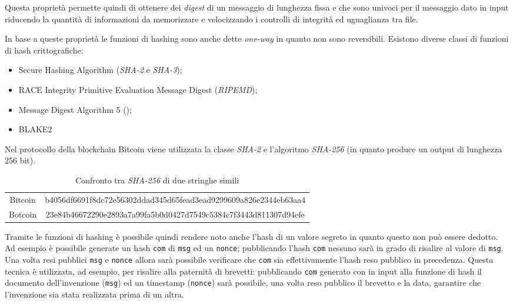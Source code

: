 Questa proprietà permette quindi di ottenere dei \textit{digest} di un messaggio di lunghezza fissa e che sono univoci per il messaggio dato in input riducendo la quantità di informazioni da memorizzare e velocizzando i controlli di integrità ed uguaglianza tra file.

In base a queste proprietà le funzioni di hashing sono anche dette \textit{one-way} in quanto non sono reversibili.\newline\newline
Esistono diverse classi di funzioni di hash crittografiche:
\begin{itemize}
    \item Secure Hashing Algorithm (\textit{SHA-2} e \textit{SHA-3});
    \item RACE Integrity Primitive  Evaluation Message Digest (\textit{RIPEMD});
    \item Message Digest Algorithm 5 ();
    \item BLAKE2
\end{itemize}

Nel protocollo della blockchain Bitcoin viene utilizzata la classe \textit{SHA-2} e l'algoritmo \textit{SHA-256} (in quanto produce un output di lunghezza 256 bit).
\begin{table}
    \caption{Confronto tra \textit{SHA-256} di due stringhe simili}
    \centering
    \begin{tabular}{c||c}
        Bitcoin & b4056df6691f8dc72e56302ddad345d65fead3ead9299609a826e2344eb63aa4 \\
        \cline{1-2}
        Botcoin & 23e84b46672290e2893a7a99fa5b0d0427d7549c5384c7f3443d811307d94efe \\
    \end{tabular}
\end{table}
Tramite le funzioni di hashing è possibile quindi rendere noto anche l'hash di un valore segreto in quanto questo non può essere dedotto. Ad esempio è possibile generate un hash \texttt{com} di \texttt{msg} ed un \texttt{nonce}; pubblicando l'hash \texttt{com} nessuno sarà in grado di risalire al valore di \texttt{msg}. Una volta resi pubblici \texttt{msg} e \texttt{nonce} allora sarà possibile verificare che \texttt{com} sia effettivamente l'hash reso pubblico in precedenza.\newline
Questa tecnica è utilizzata, ad esempio, per risalire alla paternità di brevetti: pubblicando \texttt{com} generato con in input alla funzione di hash il documento dell'invenzione (\texttt{msg}) ed un timestamp (\texttt{nonce}) sarà possibile, una volta reso pubblico il brevetto e la data, garantire che l'invenzione sia stata realizzata prima di un altra.

